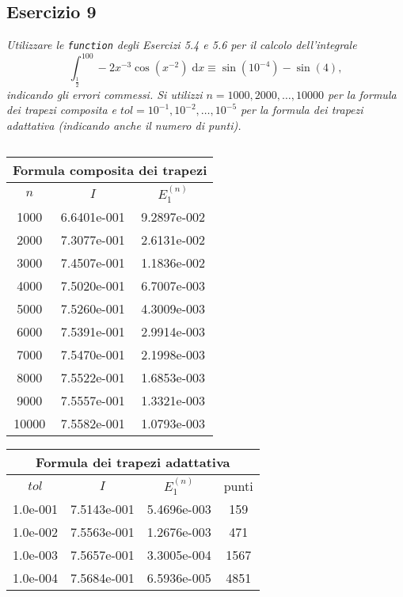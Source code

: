 \subsection{Esercizio 9}
\label{sub:es9}
\emph{Utilizzare le \lstinline{function} degli Esercizi 5.4 e 5.6 per il calcolo dell'integrale
      $$\int_{\frac{1}{2}}^{100}-2x^{-3}\cos\left(x^{-2}\right)\;\mathrm{d}x\equiv\sin\left(10^{-4}\right)-\sin(4),$$
			indicando gli errori commessi.
      Si utilizzi $n=1000,2000,\dots,10000$ per la formula dei trapezi composita e
      $tol=10^{-1},10^{-2},\dots,10^{-5}$ per la formula dei trapezi adattativa (indicando anche il numero di punti).}
\begin{sol}
	
	\normalfont
	$ $\\
	\begin{center}\begin{tabular}{c|c|c}
	\hline\multicolumn{3}{c}{Formula composita dei trapezi}\\\hline
	$n$ & $I$ & $E_1^{(n)}$\\\hline
	1000&6.6401e-001&9.2897e-002\\
	2000&7.3077e-001&2.6131e-002\\
	3000&7.4507e-001&1.1836e-002\\
	4000&7.5020e-001&6.7007e-003\\
	5000&7.5260e-001&4.3009e-003\\
	6000&7.5391e-001&2.9914e-003\\
	7000&7.5470e-001&2.1998e-003\\
	8000&7.5522e-001&1.6853e-003\\
	9000&7.5557e-001&1.3321e-003\\
	10000&7.5582e-001&1.0793e-003
	\end{tabular}\end{center}
	\begin{center}
	\begin{tabular}{c|c|c|c}
	\hline\multicolumn{4}{c}{Formula dei trapezi adattativa}\\\hline
	$tol$ & $I$ & $E_1^{(n)}$ & punti\\\hline
		1.0e-001&7.5143e-001&5.4696e-003&159\\
		1.0e-002&7.5563e-001&1.2676e-003&471\\
		1.0e-003&7.5657e-001&3.3005e-004&1567\\
		1.0e-004&7.5684e-001&6.5936e-005&4851
	\end{tabular}\end{center}
\end{sol}


